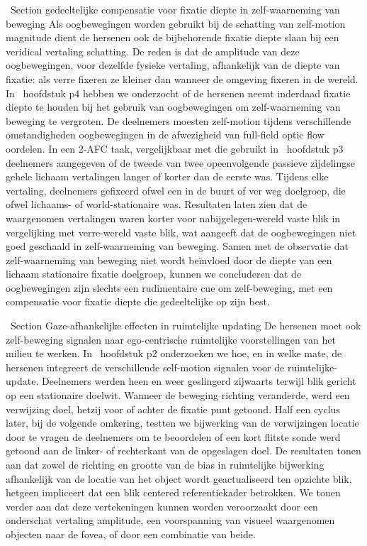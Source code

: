 \ Section {gedeeltelijke compensatie voor fixatie diepte in zelf-waarneming van beweging}
Als oogbewegingen worden gebruikt bij de schatting van zelf-motion magnitude dient de hersenen ook de bijbehorende fixatie diepte slaan bij een veridical vertaling schatting. De reden is dat de amplitude van deze oogbewegingen, voor dezelfde fysieke vertaling, afhankelijk van de diepte van fixatie: als verre fixeren ze kleiner dan wanneer de omgeving fixeren in de wereld. In \ hoofdstuk {p4} hebben we onderzocht of de hersenen neemt inderdaad fixatie diepte te houden bij het gebruik van oogbewegingen om zelf-waarneming van beweging te vergroten. De deelnemers moesten zelf-motion tijdens verschillende omstandigheden oogbewegingen in de afwezigheid van full-field optic flow oordelen. In een 2-AFC taak, vergelijkbaar met die gebruikt in \ hoofdstuk {p3} deelnemers aangegeven of de tweede van twee opeenvolgende passieve zijdelingse gehele lichaam vertalingen langer of korter dan de eerste was. Tijdens elke vertaling, deelnemers gefixeerd ofwel een in de buurt of ver weg doelgroep, die ofwel lichaams- of world-stationaire was. Resultaten laten zien dat de waargenomen vertalingen waren korter voor nabijgelegen-wereld vaste blik in vergelijking met verre-wereld vaste blik, wat aangeeft dat de oogbewegingen niet goed geschaald in zelf-waarneming van beweging. Samen met de observatie dat zelf-waarneming van beweging niet wordt beïnvloed door de diepte van een lichaam stationaire fixatie doelgroep, kunnen we concluderen dat de oogbewegingen zijn slechts een rudimentaire cue om zelf-beweging, met een compensatie voor fixatie diepte die gedeeltelijke op zijn best.

\ Section {Gaze-afhankelijke effecten in ruimtelijke updating}
De hersenen moet ook zelf-beweging signalen naar ego-centrische ruimtelijke voorstellingen van het milieu te werken. In \ hoofdstuk {p2} onderzoeken we hoe, en in welke mate, de hersenen integreert de verschillende self-motion signalen voor de ruimtelijke-update. Deelnemers werden heen en weer geslingerd zijwaarts terwijl blik gericht op een stationaire doelwit. Wanneer de beweging richting veranderde, werd een verwijzing doel, hetzij voor of achter de fixatie punt getoond. Half een cyclus later, bij de volgende omkering, testten we bijwerking van de verwijzingen locatie door te vragen de deelnemers om te beoordelen of een kort flitste sonde werd getoond aan de linker- of rechterkant van de opgeslagen doel. De resultaten tonen aan dat zowel de richting en grootte van de bias in ruimtelijke bijwerking afhankelijk van de locatie van het object wordt geactualiseerd ten opzichte blik, hetgeen impliceert dat een blik centered referentiekader betrokken. We tonen verder aan dat deze vertekeningen kunnen worden veroorzaakt door een onderschat vertaling amplitude, een voorspanning van visueel waargenomen objecten naar de fovea, of door een combinatie van beide.


